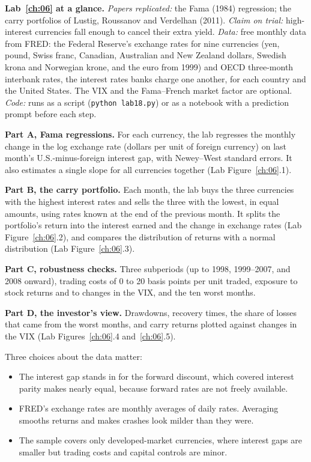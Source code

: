 \begin{callout}
\textbf{Lab~\ref{ch:06} at a glance.} \emph{Papers replicated:} the Fama (1984) regression; the carry portfolios of Lustig, Roussanov and Verdelhan (2011). \emph{Claim on trial:} high-interest currencies fall enough to cancel their extra yield. \emph{Data:} free monthly data from FRED: the Federal Reserve's exchange rates for nine currencies (yen, pound, Swiss franc, Canadian, Australian and New Zealand dollars, Swedish krona and Norwegian krone, and the euro from 1999) and OECD three-month interbank rates, the interest rates banks charge one another, for each country and the United States. The VIX and the Fama--French market factor are optional. \emph{Code:} runs as a script (\texttt{python lab18.py}) or as a notebook with a prediction prompt before each step.
\end{callout}

\textbf{Part A, Fama regressions.} For each currency, the lab regresses the monthly change in the log exchange rate (dollars per unit of foreign currency) on last month's U.S.-minus-foreign interest gap, with Newey--West standard errors. It also estimates a single slope for all currencies together (Lab Figure~\ref{ch:06}.1).

\textbf{Part B, the carry portfolio.} Each month, the lab buys the three currencies with the highest interest rates and sells the three with the lowest, in equal amounts, using rates known at the end of the previous month. It splits the portfolio's return into the interest earned and the change in exchange rates (Lab Figure~\ref{ch:06}.2), and compares the distribution of returns with a normal distribution (Lab Figure~\ref{ch:06}.3).

\textbf{Part C, robustness checks.} Three subperiods (up to 1998, 1999--2007, and 2008 onward), trading costs of 0 to 20 basis points per unit traded, exposure to stock returns and to changes in the VIX, and the ten worst months.

\textbf{Part D, the investor's view.} Drawdowns, recovery times, the share of losses that came from the worst months, and carry returns plotted against changes in the VIX (Lab Figures~\ref{ch:06}.4 and~\ref{ch:06}.5).

Three choices about the data matter:

\begin{itemize}
  \item The interest gap stands in for the forward discount, which covered interest parity makes nearly equal, because forward rates are not freely available.
  \item FRED's exchange rates are monthly averages of daily rates. Averaging smooths returns and makes crashes look milder than they were.
  \item The sample covers only developed-market currencies, where interest gaps are smaller but trading costs and capital controls are minor.
\end{itemize}

